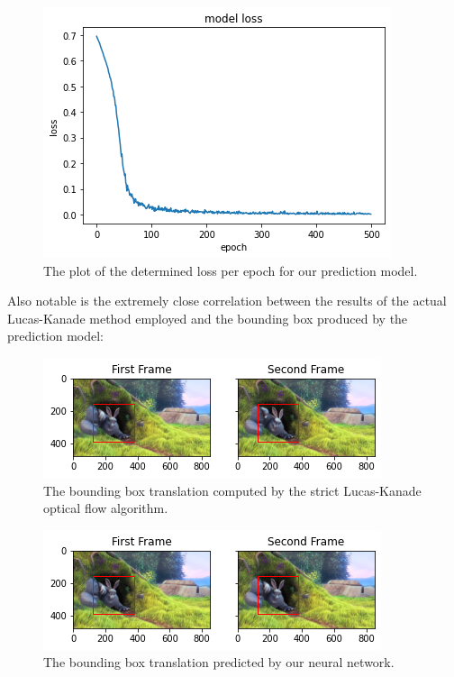 \documentclass[]{article}
\begin{document}
\begin{figure}[H]
    \centering
    \includegraphics[width=\textwidth]{output_25_0.png}
    \caption{The plot of the determined loss per epoch for our prediction model.}
    \label{fig:loss}
\end{figure}

Also notable is the extremely close correlation between the results of the actual Lucas-Kanade method employed and the bounding box produced by the prediction model:

\begin{figure}[H]
    \centering
    \includegraphics[width=\textwidth]{output_14_0.png}
    \caption{The bounding box translation computed by the strict Lucas-Kanade optical flow algorithm.}
    \label{fig:optical_flow}
\end{figure}

\begin{figure}[H]
    \centering
    \includegraphics[width=\textwidth]{output_29_0.png}
    \caption{The bounding box translation predicted by our neural network.}
    \label{fig:optical_flow_neural_net}
\end{figure}
\end{document}
